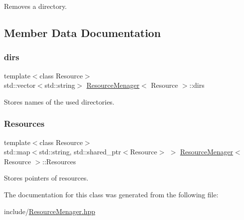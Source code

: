 Removes a directory. 



\subsection{Member Data Documentation}
\mbox{\label{class_resource_menager_a0dc38a54fb434107185e954ed6f60c2e}} 
\subsubsection{\texorpdfstring{dirs}{dirs}}
{\footnotesize\ttfamily template$<$class Resource$>$ \\
std\+::vector$<$std\+::string$>$ \mbox{\hyperlink{class_resource_menager}{Resource\+Menager}}$<$ Resource $>$\+::dirs\hspace{0.3cm}{\ttfamily [private]}}



Stores names of the used directories. 

\mbox{\label{class_resource_menager_a2ec0eb338dd837126c8ba0b53b0ddbc5}} 
\subsubsection{\texorpdfstring{Resources}{Resources}}
{\footnotesize\ttfamily template$<$class Resource$>$ \\
std\+::map$<$std\+::string, std\+::shared\+\_\+ptr$<$Resource$>$ $>$ \mbox{\hyperlink{class_resource_menager}{Resource\+Menager}}$<$ Resource $>$\+::Resources\hspace{0.3cm}{\ttfamily [private]}}



Stores pointers of resources. 



The documentation for this class was generated from the following file\+:\begin{DoxyCompactItemize}
\item 
include/\mbox{\hyperlink{_resource_menager_8hpp}{Resource\+Menager.\+hpp}}\end{DoxyCompactItemize}
